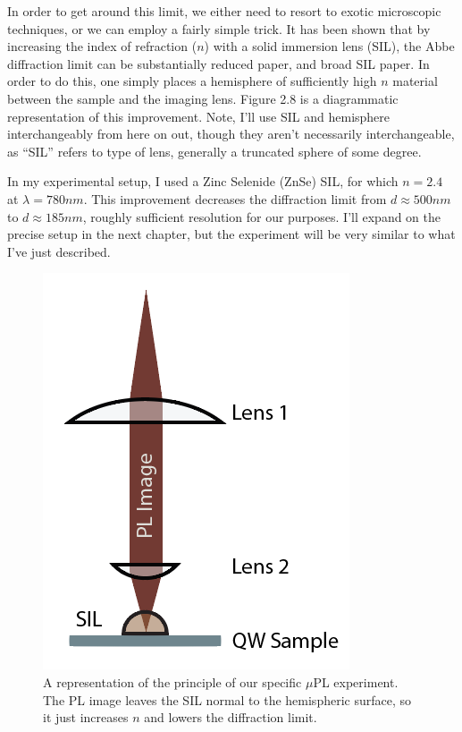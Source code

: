 \indent In order to get around this limit, we either need to resort to exotic microscopic techniques, or we can employ a fairly simple trick. It has been shown that by increasing the index of refraction ($n$) with a solid immersion lens (SIL), the Abbe diffraction limit can be substantially reduced  \cite{yoshitaapp} paper, and broad SIL paper. In order to do this, one simply places a hemisphere of sufficiently high $n$ material between the sample and the imaging lens. Figure 2.8 is a diagrammatic representation of this improvement. Note, I'll use SIL and hemisphere interchangeably from here on out, though they aren't necessarily interchangeable, as ``SIL'' refers to type of lens, generally a truncated sphere of some degree. 

\indent In my experimental setup, I used a Zinc Selenide (ZnSe) SIL, for which $n = 2.4$ at $\lambda = 780 nm$. This improvement decreases the diffraction limit from $d \approx 500nm$ to $ d \approx 185 nm$, roughly sufficient resolution for our purposes. I'll expand on the precise setup in the next chapter, but the experiment will be very similar to what I've just described.
\begin{figure}[h!]
\label{confocal2}
\centering
\includegraphics[width = .3\textwidth]{confocal2.png}
\caption{\doublespacing A representation of the principle of our specific $\mu$PL experiment. The PL image leaves the SIL normal to the hemispheric surface, so it just increases $n$ and lowers the diffraction limit.}
\end{figure}


